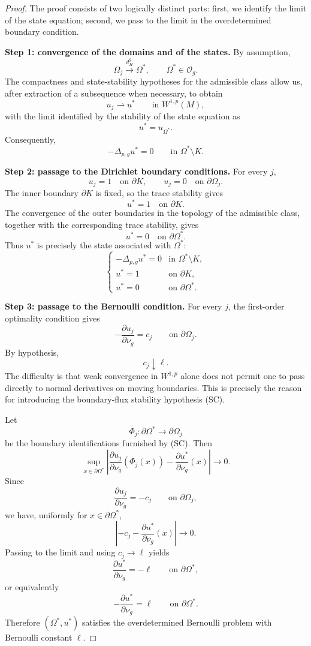 \documentclass[11pt,a4paper]{article}
\theoremstyle{definition}
\theoremstyle{remark}
\begin{document}
\begin{proof}
The proof consists of two logically distinct parts: first, we identify the
limit of the state equation; second, we pass to the limit in the
overdetermined boundary condition.

\medskip
\noindent\textbf{Step 1: convergence of the domains and of the states.}
By assumption,
\[
\Omega_j\xrightarrow{d_H^g}\Omega^\ast,
\qquad
\Omega^\ast\in\mathcal O_g.
\]
The compactness and state-stability hypotheses for the admissible class
allow us, after extraction of a subsequence when necessary, to obtain
\[
u_j\rightharpoonup u^\ast
\qquad\text{in }W^{1,p}(M),
\]
with the limit identified by the stability of the state equation as
\[
u^\ast=u_{\Omega^\ast}.
\]
Consequently,
\[
-\Delta_{p,g}u^\ast=0
\qquad\text{in }\Omega^\ast\setminus K.
\]

\medskip
\noindent\textbf{Step 2: passage to the Dirichlet boundary conditions.}
For every $j$,
\[
u_j=1\quad\text{on }\partial K,
\qquad
u_j=0\quad\text{on }\partial\Omega_j.
\]
The inner boundary $\partial K$ is fixed, so the trace stability gives
\[
u^\ast=1\quad\text{on }\partial K.
\]
The convergence of the outer boundaries in the topology of the
admissible class, together with the corresponding trace stability, gives
\[
u^\ast=0\quad\text{on }\partial\Omega^\ast.
\]
Thus $u^\ast$ is precisely the state associated with $\Omega^\ast$:
\[
\begin{cases}
-\Delta_{p,g}u^\ast=0
&\text{in }\Omega^\ast\setminus K,\\
u^\ast=1
&\text{on }\partial K,\\
u^\ast=0
&\text{on }\partial\Omega^\ast.
\end{cases}
\]

\medskip
\noindent\textbf{Step 3: passage to the Bernoulli condition.}
For every $j$, the first-order optimality condition gives
\[
-\frac{\partial u_j}{\partial\nu_g}=c_j
\qquad\text{on }\partial\Omega_j.
\]
By hypothesis,
\[
c_j\downarrow\ell.
\]
The difficulty is that weak convergence in $W^{1,p}$ alone does not
permit one to pass directly to normal derivatives on moving
boundaries. This is precisely the reason for introducing the
boundary-flux stability hypothesis {\rm (SC)}.

Let
\[
\Phi_j:\partial\Omega^\ast\longrightarrow\partial\Omega_j
\]
be the boundary identifications furnished by {\rm (SC)}. Then
\[
\sup_{x\in\partial\Omega^\ast}
\left|
\frac{\partial u_j}{\partial\nu_g}(\Phi_j(x))
-
\frac{\partial u^\ast}{\partial\nu_g}(x)
\right|
\longrightarrow0.
\]
Since
\[
\frac{\partial u_j}{\partial\nu_g}=-c_j
\qquad\text{on }\partial\Omega_j,
\]
we have, uniformly for $x\in\partial\Omega^\ast$,
\[
\left|
-c_j-\frac{\partial u^\ast}{\partial\nu_g}(x)
\right|
\longrightarrow0.
\]
Passing to the limit and using $c_j\to\ell$ yields
\[
\frac{\partial u^\ast}{\partial\nu_g}=-\ell
\qquad\text{on }\partial\Omega^\ast,
\]
or equivalently
\[
-\frac{\partial u^\ast}{\partial\nu_g}
=\ell
\qquad\text{on }\partial\Omega^\ast.
\]
Therefore $(\Omega^\ast,u^\ast)$ satisfies the overdetermined Bernoulli
problem with Bernoulli constant $\ell$.
\end{proof}
\end{document}
